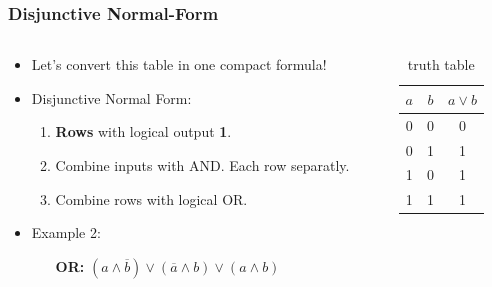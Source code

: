\documentclass{beamer}
\begin{document}
\begin{frame}\frametitle{Disjunctive Normal-Form}
  
  \begin{columns}
  \begin{column}{6cm}
  \begin{itemize}
    \item Let's convert this table in one compact formula!
    \item Disjunctive Normal Form:
    \begin{enumerate}
     \item \textbf{Rows} with logical output \textbf{1}.
     \item Combine inputs with AND. Each row separatly.
     \item Combine rows with logical OR.
    \end{enumerate}
    \item Example 2: 
    \begin{itemize}
      \item [\textbf{OR:}]$(a\land \overline{b})\lor(\overline{a}\land b)\lor(a\land b)$
    \end{itemize}
  \end{itemize}
  \end{column}
  
    
  \begin{column}{6cm}
  \begin{table}[H]
  \centering
  \begin{tabular}{c|c||c}
  \textbf{$a$} & \textbf{$b$} & \textbf{$a\lor b$} \\ \hline
  0          & 0          & 0      \\
  0          & 1          & 1  \\
  1          & 0          & 1   \\
  1          & 1          & 1 
  \end{tabular}
  \caption{truth table}
  \label{tab:truth}
  \end{table}
  \end{column}
  
  \end{columns}  
  
  
  
\end{frame}
\end{document}
